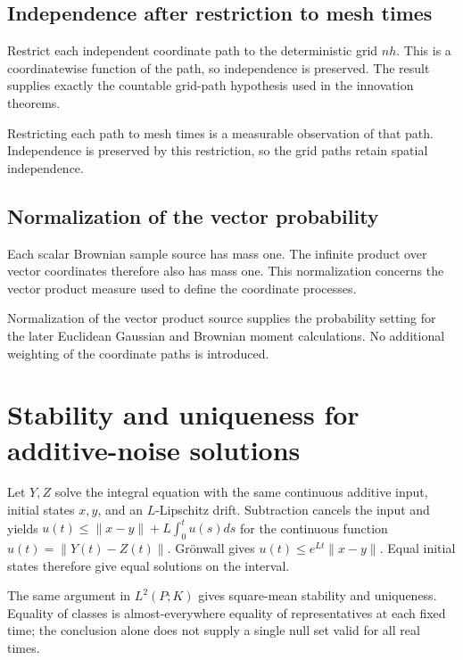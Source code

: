 \documentclass[11pt,a4paper]{article}
\begin{document}
\subsection{\texorpdfstring{Independence after restriction to mesh times}{Independence after restriction to mesh times}}


Restrict each independent coordinate path to the deterministic grid \(nh\). This is a coordinatewise function of the path, so independence is preserved. The result supplies exactly the countable grid-path hypothesis used in the innovation theorems.



Restricting each path to mesh times is a measurable observation of that path. Independence is preserved by this restriction, so the grid paths retain spatial independence.


\subsection{\texorpdfstring{Normalization of the vector probability}{Normalization of the vector probability}}


Each scalar Brownian sample source has mass one. The infinite product over vector coordinates therefore also has mass one. This normalization concerns the vector product measure used to define the coordinate processes.



Normalization of the vector product source supplies the probability setting for the later Euclidean Gaussian and Brownian moment calculations. No additional weighting of the coordinate paths is introduced.


\section{\texorpdfstring{Stability and uniqueness for additive-noise solutions}{Stability and uniqueness for additive-noise solutions}}


Let \(Y,Z\) solve the integral equation with the same continuous additive input, initial states \(x,y\), and an \(L\)-Lipschitz drift. Subtraction cancels the input and yields \(u(t)\le\|x-y\|+L\int_0^tu(s)ds\) for the continuous function \(u(t)=\|Y(t)-Z(t)\|\). Grönwall gives \(u(t)\le e^{Lt}\|x-y\|\). Equal initial states therefore give equal solutions on the interval.



The same argument in \(L^2(P;K)\) gives square-mean stability and uniqueness. Equality of classes is almost-everywhere equality of representatives at each fixed time; the conclusion alone does not supply a single null set valid for all real times.
\end{document}
